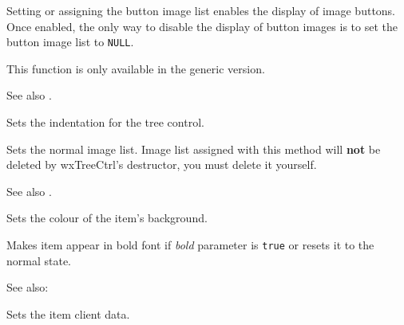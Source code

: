 Setting or assigning the button image list enables the display of image buttons.
Once enabled, the only way to disable the display of button images is to set
the button image list to {\tt NULL}.

This function is only available in the generic version.

See also .


\label{wxtreectrlsetindent}


Sets the indentation for the tree control.


\label{wxtreectrlsetimagelist}


Sets the normal image list. Image list assigned with this method will
{\bf not} be deleted by wxTreeCtrl's destructor, you must delete it yourself.

See also .



\label{wxtreectrlsetitembackgroundcolour}


Sets the colour of the item's background.


\label{wxtreectrlsetitembold}


Makes item appear in bold font if {\it bold} parameter is {\tt true} or resets it to
the normal state.

See also: 


\label{wxtreectrlsetitemdata}


Sets the item client data.

%

